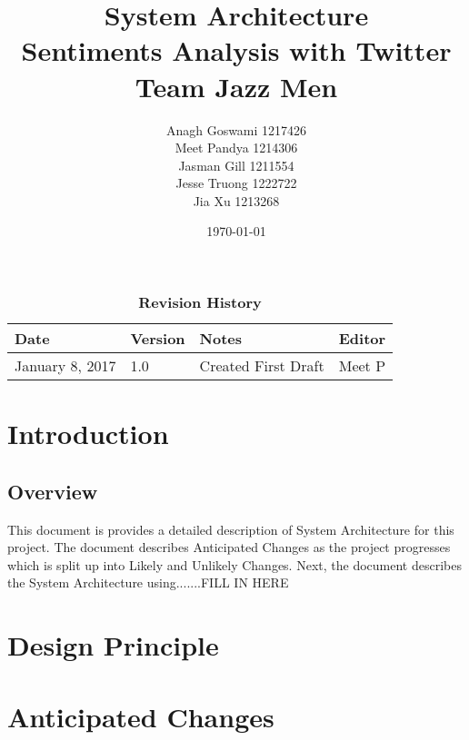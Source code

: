 \documentclass[12pt, titlepage]{article}
\begin{document}
\title{System Architecture \\ Sentiments Analysis with Twitter \\ Team Jazz Men}
\author{Anagh Goswami 1217426 \\ Meet Pandya 1214306 \\ Jasman Gill  1211554 \\ Jesse Truong  1222722 \\ Jia Xu  1213268 \\}
\date{\today}
	
\maketitle

\tableofcontents
\listoftables
\listoffigures


\begin{table}[htb]
\caption*{\bf Revision History}
\begin{tabularx}{\textwidth}{p{3.5cm}p{2cm}p{3.5cm}X}
\toprule {\bf Date} & {\bf Version} & {\bf Notes} & {\bf Editor}\\
\midrule
January 8, 2017 & 1.0 & Created First Draft & Meet P\\
\bottomrule
\end{tabularx}
\end{table}

\newpage


\section{Introduction}
\subsection{Overview}
This document is provides a detailed description of System Architecture for this project. The document describes Anticipated Changes as the project progresses which is split up into Likely and Unlikely Changes. Next, the document describes the System Architecture using.......FILL IN HERE

\section{Design Principle}


\section{Anticipated Changes}
\end{document}
